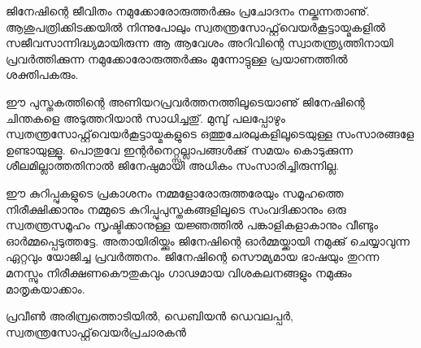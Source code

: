 
ജിനേഷിന്റെ ജീവിതം നമുക്കോരോരുത്തര്‍ക്കും പ്രചോദനം നല്കുന്നതാണു്. ആശുപത്രിക്കിടക്കയില്‍ നിന്നുപോലും സ്വതന്ത്രസോഫ്റ്റ്‌വെയര്‍കൂട്ടായ്മകളില്‍ സജീവസാന്നിദ്ധ്യമായിരുന്ന ആ ആവേശം അറിവിന്റെ സ്വാതന്ത്ര്യത്തിനായി പ്രവര്‍ത്തിക്കുന്ന നമുക്കോരോരുത്തര്‍ക്കും മുന്നോട്ടുള്ള പ്രയാണത്തില്‍ ശക്തിപകരും. 

ഈ പുസ്തകത്തിന്റെ അണിയറപ്രവര്‍ത്തനത്തിലൂടെയാണു് ജിനേഷിന്റെ ചിന്തകളെ അടുത്തറിയാന്‍ സാധിച്ചതു്. മുമ്പു് പലപ്പോഴും സ്വതന്ത്രസോഫ്റ്റ്‌വെയര്‍കൂട്ടായ്മകളുടെ ഒത്തുചേരലുകളിലൂടെയുള്ള സംസാരങ്ങളേ ഉണ്ടായുള്ളൂ. പൊതുവേ ഇന്റര്‍നെറ്റ്സല്ലാപങ്ങള്‍ക്കു് സമയം കൊടുക്കുന്ന ശീലമില്ലാത്തതിനാല്‍ ജിനേഷുമായി അധികം സംസാരിച്ചിരുന്നില്ല.

ഈ കുറിപ്പുകളുടെ പ്രകാശനം നമ്മളോരോരുത്തരേയും സമൂഹത്തെ നിരീക്ഷിക്കാനും നമ്മുടെ കുറിപ്പുപുസ്തകങ്ങളിലൂടെ സംവദിക്കാനും ഒരു സ്വതന്ത്രസമൂഹം സൃഷ്ടിക്കാനുള്ള യജ്ഞത്തില്‍ പങ്കാളികളാകാനും വീണ്ടും ഓര്‍മ്മപ്പെടുത്തട്ടേ. അതായിരിയ്ക്കും ജിനേഷിന്റെ ഓര്‍മ്മയ്ക്കായി നമുക്കു് ചെയ്യാവുന്ന ഏറ്റവും യോജിച്ച പ്രവര്‍ത്തനം. ജിനേഷിന്റെ സൌമ്യമായ ഭാഷയും തുറന്ന മനസ്സും നിരീക്ഷണകൌതുകവും ഗാഢമായ വിശകലനങ്ങളും നമുക്കും മാതൃകയാക്കാം.

\begin{flushright}പ്രവീണ്‍ അരിമ്പ്രത്തൊടിയില്‍, ഡെബിയന്‍ ഡെവലപ്പര്‍, സ്വതന്ത്രസോഫ്റ്റ്‌വെയര്‍പ്രചാരകന്‍\end{flushright}
\newpage

